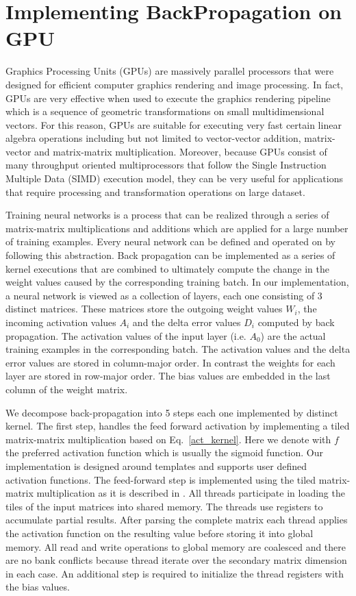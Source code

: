 \section{Implementing BackPropagation on GPU}
\label{GPUBackProp}

Graphics Processing Units (GPUs) are massively parallel processors that were designed for efficient computer graphics rendering and image processing. In fact, GPUs are very effective when used to execute the graphics rendering pipeline which is a sequence of geometric transformations on small multidimensional vectors. For this reason, GPUs are suitable for executing very fast certain linear algebra operations including but not limited to vector-vector addition, matrix-vector and matrix-matrix multiplication. Moreover, because GPUs consist of many throughput oriented multiprocessors that follow the Single Instruction Multiple Data (SIMD) execution model, they can be very useful for applications that require processing and transformation operations on large dataset.

Training neural networks is a process that can be realized through a series of matrix-matrix multiplications and additions which are applied for a large number of training examples. Every neural network can be defined and operated on by following this abstraction. Back propagation can be implemented as a series of kernel executions that are combined to ultimately compute the change in the weight values caused by the corresponding training batch. In our implementation, a neural network is viewed as a collection of layers, each one consisting of 3 distinct matrices. These matrices store the outgoing weight values $W_i$, the incoming activation values $A_i$ and the delta error values $D_i$ computed by back propagation. The activation values of the input layer (i.e. $A_0$) are the actual training examples in the corresponding batch. The activation values and the delta error values are stored in column-major order. In contrast the weights for each layer are stored in row-major order. The bias values are embedded in the last column of the weight matrix.

We decompose back-propagation into 5 steps each one implemented by distinct kernel. The first step, handles the feed forward activation by implementing a tiled matrix-matrix multiplication based on Eq.~\ref{act_kernel}. Here we denote with $f$ the preferred activation function which is usually the sigmoid function. Our implementation is designed around templates and supports user defined activation functions. The feed-forward step is implemented using the tiled matrix-matrix multiplication as it is described in \cite{}. All threads participate in loading the tiles of the input matrices into shared memory. The threads use registers to accumulate partial results. After parsing the complete matrix each thread applies the activation function on the resulting value before storing it into global memory. All read and write operations to global memory are coalesced and there are no bank conflicts because thread iterate over the secondary matrix dimension in each case. An additional step is required to initialize the thread registers with the bias values.

